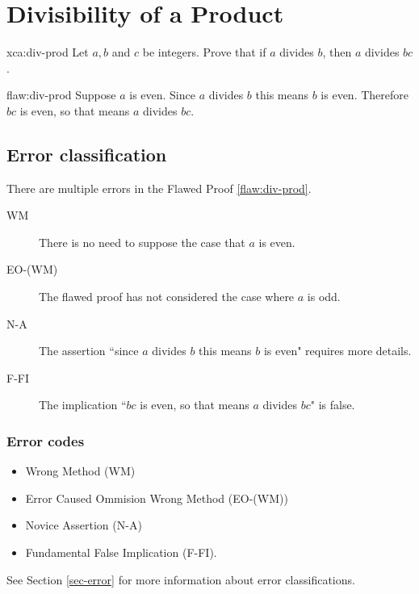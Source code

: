 \section{Divisibility of a Product}

\begin{xca}{xca:div-prod}
Let $a,b$ and $c$ be integers. Prove that if $a$ divides $b$, then $a$ divides $bc$. 
\end{xca}

\begin{flaw}{flaw:div-prod} 
Suppose $a$ is even. Since $a$ divides $b$ this means $b$ is even. Therefore $bc$ is even, so that means $a$ divides $bc$. 
\end{flaw}

\clearpage
\subsection{Error classification}

There are multiple errors
 in the Flawed Proof \ref{flaw:div-prod}. 

 
 \begin{description}
    \item[WM]  There is no need to suppose the case that $a$ is even.
    \item[EO-(WM)] The flawed proof has not considered the case where $a$ is odd. 
    \item[N-A] The assertion ``since $a$ divides $b$ this means $b$ is even" requires more details. 
    \item[F-FI] The implication  ``$bc$ is even, so that means $a$ divides $bc$" is false. 
 	
 \end{description}

 
\subsubsection{Error codes}
\begin{itemize}
    \item Wrong Method (WM)
    \item Error Caused Ommision Wrong Method (EO-(WM))
    \item Novice Assertion (N-A)
	\item 	Fundamental False Implication (F-FI). 
\end{itemize}
See Section \ref{sec-error} for more information about error classifications.

